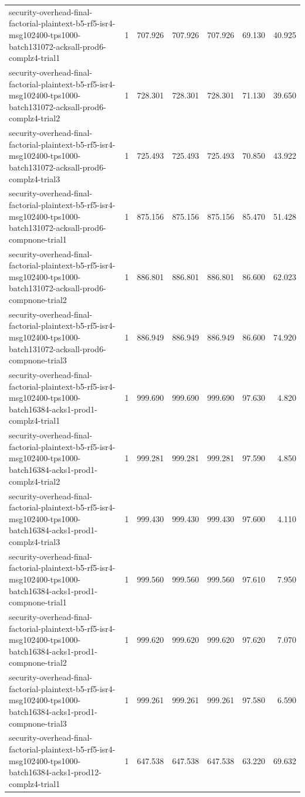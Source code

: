 \begin{tabular}{lrrrrrr}
security-overhead-final-factorial-plaintext-b5-rf5-isr4-msg102400-tps1000-batch131072-acksall-prod6-complz4-trial1 & 1 & 707.926 & 707.926 & 707.926 & 69.130 & 40.925 \\
security-overhead-final-factorial-plaintext-b5-rf5-isr4-msg102400-tps1000-batch131072-acksall-prod6-complz4-trial2 & 1 & 728.301 & 728.301 & 728.301 & 71.130 & 39.650 \\
security-overhead-final-factorial-plaintext-b5-rf5-isr4-msg102400-tps1000-batch131072-acksall-prod6-complz4-trial3 & 1 & 725.493 & 725.493 & 725.493 & 70.850 & 43.922 \\
security-overhead-final-factorial-plaintext-b5-rf5-isr4-msg102400-tps1000-batch131072-acksall-prod6-compnone-trial1 & 1 & 875.156 & 875.156 & 875.156 & 85.470 & 51.428 \\
security-overhead-final-factorial-plaintext-b5-rf5-isr4-msg102400-tps1000-batch131072-acksall-prod6-compnone-trial2 & 1 & 886.801 & 886.801 & 886.801 & 86.600 & 62.023 \\
security-overhead-final-factorial-plaintext-b5-rf5-isr4-msg102400-tps1000-batch131072-acksall-prod6-compnone-trial3 & 1 & 886.949 & 886.949 & 886.949 & 86.600 & 74.920 \\
security-overhead-final-factorial-plaintext-b5-rf5-isr4-msg102400-tps1000-batch16384-acks1-prod1-complz4-trial1 & 1 & 999.690 & 999.690 & 999.690 & 97.630 & 4.820 \\
security-overhead-final-factorial-plaintext-b5-rf5-isr4-msg102400-tps1000-batch16384-acks1-prod1-complz4-trial2 & 1 & 999.281 & 999.281 & 999.281 & 97.590 & 4.850 \\
security-overhead-final-factorial-plaintext-b5-rf5-isr4-msg102400-tps1000-batch16384-acks1-prod1-complz4-trial3 & 1 & 999.430 & 999.430 & 999.430 & 97.600 & 4.110 \\
security-overhead-final-factorial-plaintext-b5-rf5-isr4-msg102400-tps1000-batch16384-acks1-prod1-compnone-trial1 & 1 & 999.560 & 999.560 & 999.560 & 97.610 & 7.950 \\
security-overhead-final-factorial-plaintext-b5-rf5-isr4-msg102400-tps1000-batch16384-acks1-prod1-compnone-trial2 & 1 & 999.620 & 999.620 & 999.620 & 97.620 & 7.070 \\
security-overhead-final-factorial-plaintext-b5-rf5-isr4-msg102400-tps1000-batch16384-acks1-prod1-compnone-trial3 & 1 & 999.261 & 999.261 & 999.261 & 97.580 & 6.590 \\
security-overhead-final-factorial-plaintext-b5-rf5-isr4-msg102400-tps1000-batch16384-acks1-prod12-complz4-trial1 & 1 & 647.538 & 647.538 & 647.538 & 63.220 & 69.632 \\

\end{tabular}

